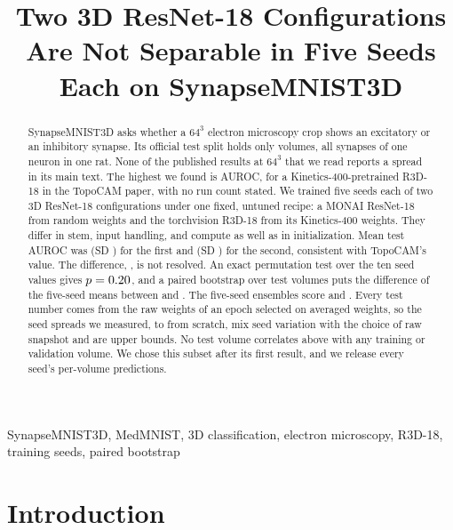 \documentclass[conference]{IEEEtran}
\begin{document}
\title{Two 3D ResNet-18 Configurations Are Not Separable in Five Seeds Each on SynapseMNIST3D}

\author{
}

\maketitle

\begin{abstract}
SynapseMNIST3D asks whether a $64^3$ electron microscopy crop shows an excitatory or an
inhibitory synapse. Its official test split holds only \nTest{} volumes, all synapses of one
neuron in one rat. None of the published results at $64^3$ that we read reports a spread in its main text. The
highest we found is \baseTopoAuroc{} AUROC, for a Kinetics-400-pretrained R3D-18 in the
TopoCAM paper, with no run count stated. We trained five seeds each of two 3D ResNet-18
configurations under one fixed, untuned recipe: a MONAI ResNet-18 from random weights and
the torchvision R3D-18 from its Kinetics-400 weights. They differ in stem, input handling,
and compute as well as in initialization. Mean test AUROC was \meanAurocScratch{} (SD
\sdAurocScratch{}) for the first and \meanAurocKinetics{} (SD \sdAurocKinetics{}) for the
second, consistent with TopoCAM's value. The difference, \seedDiff{}, is not resolved. An
exact permutation test over the ten seed values gives $p=0.20{}$, and a paired bootstrap over
test volumes puts the difference of the five-seed means between \pooledLo{} and
\pooledHi{}. The five-seed ensembles score \ensembleScratch{} and \ensembleKinetics{}. Every test number comes from the raw weights of
an epoch selected on averaged weights, so the seed spreads we measured, \minAurocScratch{}
to \maxAurocScratch{} from scratch, mix seed variation with the choice of raw snapshot and
are upper bounds. No test volume correlates
above \dupMax{} with any training or validation volume. We chose this subset after its first
result, and we release every seed's per-volume predictions.
\end{abstract}

\begin{IEEEkeywords}
SynapseMNIST3D, MedMNIST, 3D classification, electron microscopy, R3D-18, training seeds,
paired bootstrap
\end{IEEEkeywords}

\section{Introduction}
\end{document}

